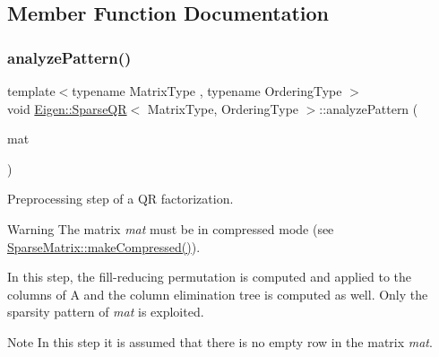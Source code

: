 \subsection{Member Function Documentation}
\mbox{\label{class_eigen_1_1_sparse_q_r_a4b425ddb1358c914d764cde48853a4f6}} 
\subsubsection{\texorpdfstring{analyzePattern()}{analyzePattern()}}
{\footnotesize\ttfamily template$<$typename Matrix\+Type , typename Ordering\+Type $>$ \\
void \mbox{\hyperlink{class_eigen_1_1_sparse_q_r}{Eigen\+::\+Sparse\+QR}}$<$ Matrix\+Type, Ordering\+Type $>$\+::analyze\+Pattern (\begin{DoxyParamCaption}\item[{const Matrix\+Type \&}]{mat }\end{DoxyParamCaption})}



Preprocessing step of a QR factorization. 

\begin{DoxyWarning}{Warning}
The matrix {\itshape mat} must be in compressed mode (see \mbox{\hyperlink{class_eigen_1_1_sparse_matrix_a5ff54ffc10296f9466dc81fa888733fd}{Sparse\+Matrix\+::make\+Compressed()}}).
\end{DoxyWarning}
In this step, the fill-\/reducing permutation is computed and applied to the columns of A and the column elimination tree is computed as well. Only the sparsity pattern of {\itshape mat} is exploited.

\begin{DoxyNote}{Note}
In this step it is assumed that there is no empty row in the matrix {\itshape mat}. 
\end{DoxyNote}
\mbox{\label{class_eigen_1_1_sparse_q_r_a57bedc9b1351c0995bae8ad0088a6fce}} 
